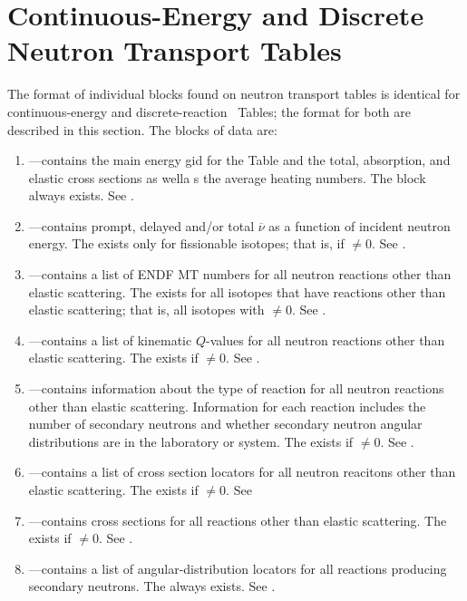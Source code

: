\section{Continuous-Energy and Discrete Neutron Transport Tables}\label{sec:ContinuousEnergyNeutron}
The format of individual blocks found on neutron transport tables is identical for continuous-energy and discrete-reaction \ACE\ Tables; the format for both are described in this section. The blocks of data are:
\begin{enumerate}
  \item \textbf{}---contains the main energy gid for the Table and the total, absorption, and elastic cross sections as wella s the average heating numbers. The  block always exists. See .
  \item \textbf{}---contains prompt, delayed and/or total $\overline{\nu}$ as a function of incident neutron energy. The  exists only for fissionable isotopes; that is, if $\neq0$. See .
  \item \textbf{}---contains a list of ENDF MT numbers for all neutron reactions other than elastic scattering. The  exists for all isotopes that have reactions other than elastic scattering; that is, all isotopes with $\neq0$. See .
  \item \textbf{}---contains a list of kinematic $Q$-values for all neutron reactions other than elastic scattering. The  exists if $\neq0$. See .
  \item \textbf{}---contains information about the type of reaction for all neutron reactions other than elastic scattering. Information for each reaction includes the number of secondary neutrons and whether secondary neutron angular distributions are in the laboratory or \CM system. The  exists if $\neq0$. See .
  \item \textbf{}---contains a list of cross section locators for all neutron reacitons other than elastic scattering. The  exists if $\neq0$. See 
  \item \textbf{}---contains cross sections for all reactions other than elastic scattering. The  exists if $\neq0$. See .
  \item \textbf{}---contains a list of angular-distribution locators for all reactions producing secondary neutrons. The  always exists. See .

\end{enumerate}
